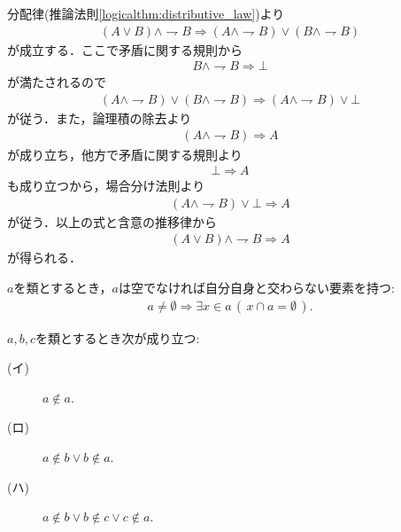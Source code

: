	\begin{prf}
		分配律(推論法則\ref{logicalthm:distributive_law})より
		\begin{align}
			(A \vee B) \wedge \rightharpoondown B
			\Longrightarrow (A \wedge \rightharpoondown B) \vee (B \wedge \rightharpoondown B)
		\end{align}
		が成立する．ここで矛盾に関する規則から
		\begin{align}
			B \wedge \rightharpoondown B \Longrightarrow \bot
		\end{align}
		が満たされるので
		\begin{align}
			(A \wedge \rightharpoondown B) \vee (B \wedge \rightharpoondown B)
			\Longrightarrow (A \wedge \rightharpoondown B) \vee \bot
		\end{align}
		が従う．また，論理積の除去より
		\begin{align}
			(A \wedge \rightharpoondown B) \Longrightarrow A
		\end{align}
		が成り立ち，他方で矛盾に関する規則より
		\begin{align}
			\bot \Longrightarrow A
		\end{align}
		も成り立つから，場合分け法則より
		\begin{align}
			(A \wedge \rightharpoondown B) \vee \bot \Longrightarrow A
		\end{align}
		が従う．以上の式と含意の推移律から
		\begin{align}
			(A \vee B) \wedge \rightharpoondown B \Longrightarrow A
		\end{align}
		が得られる．
		\QED
	\end{prf}
	
	\begin{screen}
		\begin{axm}[正則性公理]
			$a$を類とするとき，$a$は空でなければ自分自身と交わらない要素を持つ:
			\begin{align}
				a \neq \emptyset \Longrightarrow 
				\exists x \in a\, (\, x \cap a = \emptyset\, ).
			\end{align}
		\end{axm}
	\end{screen}
	
	\begin{screen}
		\begin{thm}[いかなる類も自分自身を要素に持たない]
		\label{thm:no_set_is_an_element_of_itself}
			$a,b,c$を類とするとき次が成り立つ:
			\begin{description}
				\item[(イ)] $a \notin a$.
				
				\item[(ロ)] $a \notin b \vee b \notin a$.
				
				\item[(ハ)] $a \notin b \vee b \notin c \vee c \notin a$.
			\end{description}
		\end{thm}
	\end{screen}
	
